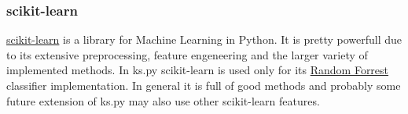         
        \subsubsection{scikit-learn}
            \href{https://scikit-learn.org/stable/}{scikit-learn} is a library for Machine Learning in Python. It is pretty powerfull
            due to its extensive preprocessing, feature engeneering and the larger variety of implemented methods. In ks.py scikit-learn is 
            used only for its \href{https://scikit-learn.org/stable/modules/generated/sklearn.ensemble.RandomForestClassifier.html}{Random Forrest}
            classifier implementation. In general it is full of good methods and probably some future extension of ks.py may also use other scikit-learn
            features. 

            


